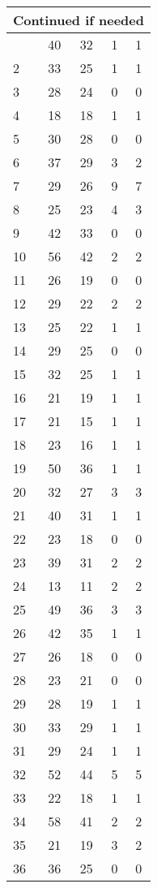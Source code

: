 \begin{center}
\begin{longtable}{l|c|c|c|c}
\hline \multicolumn{5}{|r|}{{Continued if needed}} \\ \hline
\endfoot 
1 & 40 & 32 & 1 & 1\\ \hline
2 & 33 & 25 & 1 & 1\\ \hline
3 & 28 & 24 & 0 & 0\\ \hline
4 & 18 & 18 & 1 & 1\\ \hline
5 & 30 & 28 & 0 & 0\\ \hline
6 & 37 & 29 & 3 & 2\\ \hline
7 & 29 & 26 & 9 & 7\\ \hline
8 & 25 & 23 & 4 & 3\\ \hline
9 & 42 & 33 & 0 & 0\\ \hline
10 & 56 & 42 & 2 & 2\\ \hline
11 & 26 & 19 & 0 & 0\\ \hline
12 & 29 & 22 & 2 & 2\\ \hline
13 & 25 & 22 & 1 & 1\\ \hline
14 & 29 & 25 & 0 & 0\\ \hline
15 & 32 & 25 & 1 & 1\\ \hline
16 & 21 & 19 & 1 & 1\\ \hline
17 & 21 & 15 & 1 & 1\\ \hline
18 & 23 & 16 & 1 & 1\\ \hline
19 & 50 & 36 & 1 & 1\\ \hline
20 & 32 & 27 & 3 & 3\\ \hline
21 & 40 & 31 & 1 & 1\\ \hline
22 & 23 & 18 & 0 & 0\\ \hline
23 & 39 & 31 & 2 & 2\\ \hline
24 & 13 & 11 & 2 & 2\\ \hline
25 & 49 & 36 & 3 & 3\\ \hline
26 & 42 & 35 & 1 & 1\\ \hline
27 & 26 & 18 & 0 & 0\\ \hline
28 & 23 & 21 & 0 & 0\\ \hline
29 & 28 & 19 & 1 & 1\\ \hline
30 & 33 & 29 & 1 & 1\\ \hline
31 & 29 & 24 & 1 & 1\\ \hline
32 & 52 & 44 & 5 & 5\\ \hline
33 & 22 & 18 & 1 & 1\\ \hline
34 & 58 & 41 & 2 & 2\\ \hline
35 & 21 & 19 & 3 & 2\\ \hline
36 & 36 & 25 & 0 & 0\\ \hline

\end{longtable}
\end{center}
